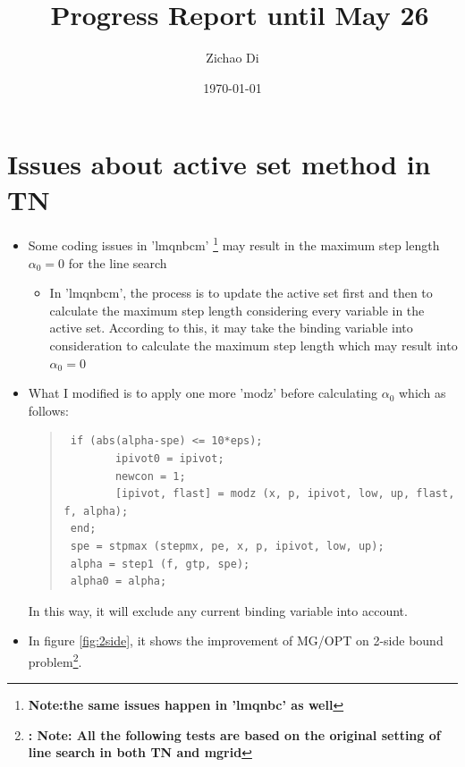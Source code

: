 \documentclass[10pt]{article}
\title{\ Progress Report until May 26}
\author{Zichao Di}
\date{\today}
\begin{document}
  \maketitle 

\section {Issues about active set method in TN}
\begin{itemize}
\item Some coding issues in 'lmqnbcm' \footnote{\bf Note:the same issues happen in 'lmqnbc' as well} may result in the maximum step length $\alpha_{0}=0$ for the line search
\begin{itemize}
\item In 'lmqnbcm', the process is to update the active set first and then to calculate the maximum step length considering every variable in the active set. According to this, it may take the binding variable into consideration to calculate the maximum step length which may result into $\alpha_{0}=0$
\end{itemize}
\item What I modified  is to apply one more 'modz' before calculating $\alpha_{0}$ which as follows:
\begin{quote}
\begin{verbatim}
 if (abs(alpha-spe) <= 10*eps);
        ipivot0 = ipivot;
        newcon = 1;
        [ipivot, flast] = modz (x, p, ipivot, low, up, flast, f, alpha);
 end;
 spe = stpmax (stepmx, pe, x, p, ipivot, low, up);
 alpha = step1 (f, gtp, spe);
 alpha0 = alpha;
\end{verbatim}
\end{quote}
In this way, it will exclude any current binding variable into account.
\item In figure \ref{fig:2side}, it shows the improvement of MG/OPT on 2-side bound problem\footnote{\bf: Note: All the following tests are based on the original setting of line search in both TN and mgrid}.
\end {itemize}
\end{document}
